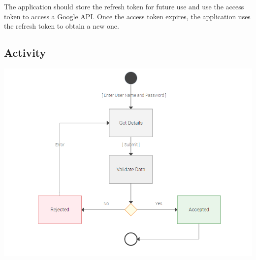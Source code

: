 The application should store the refresh token for future use and use the access token to access a Google API. Once the access token expires, the application uses the refresh token to obtain a new one.

\subsection{Activity}
\par
\includegraphics[width=\textwidth]{Activity_Diagram}
